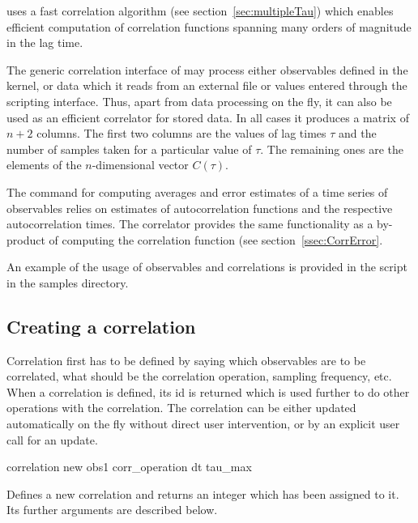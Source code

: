 \es uses a fast correlation algorithm (see section~\ref{sec:multipleTau})
which enables efficient computation of correlation functions spanning
many orders of magnitude in the lag time. 

The generic correlation interface of \es may process either observables
defined in the kernel, or data which it reads from an external file
or values entered through the scripting interface. 
Thus, apart from
data processing on the fly, it can also be used as an efficient correlator
for stored data. In all cases it produces a matrix of 
$n+2$ columns. The first two columns are the values of lag times $\tau$ and 
the number of samples taken for a particular value of $\tau$. The
remaining ones are the elements of the $n$-dimensional vector $C(\tau)$.

The  command for computing averages and error estimates 
of a time series of observables relies on estimates of autocorrelation
functions and the respective autocorrelation times.
The correlator provides the same functionality as a by-product of computing
the correlation function (see section~\ref{ssec:CorrError}.

An example of the usage of observables and correlations is provided 
in the script  in the samples directory.


\subsection{Creating a correlation}

Correlation first has to be defined by saying which observables 
are to be correlated, what should be the correlation operation, sampling
frequency, etc. When a correlation is defined, its id is returned which is
used further to do other operations with the correlation.
The correlation can be either updated automatically on the fly without
direct user intervention, or by an explicit user call for an update.

\begin{essyntax}
correlation new obs1   corr_operation  dt  tau_max   
\end{essyntax}

Defines a new correlation and returns an integer
 which has been assigned to it. 
Its further arguments are described below.

